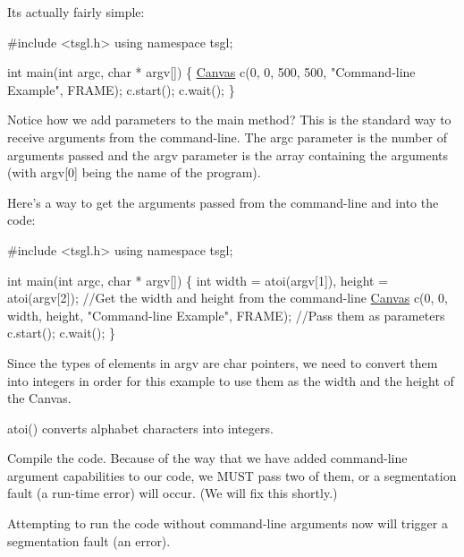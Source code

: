 Its actually fairly simple\-:


\begin{DoxyCode}
\textcolor{preprocessor}{#include <tsgl.h>}
\textcolor{keyword}{using namespace }tsgl;

\textcolor{keywordtype}{int} main(\textcolor{keywordtype}{int} argc, \textcolor{keywordtype}{char} * argv[]) \{
  \hyperlink{classtsgl_1_1_canvas}{Canvas} c(0, 0, 500, 500, \textcolor{stringliteral}{"Command-line Example"}, FRAME);
  c.start();
  c.wait();
\}
\end{DoxyCode}


Notice how we add parameters to the main method? This is the standard way to receive arguments from the command-\/line. The {\ttfamily argc} parameter is the number of arguments passed and the {\ttfamily argv} parameter is the array containing the arguments (with {\ttfamily argv\mbox{[}0\mbox{]}} being the name of the program).

Here's a way to get the arguments passed from the command-\/line and into the code\-:


\begin{DoxyCode}
\textcolor{preprocessor}{#include <tsgl.h>}
\textcolor{keyword}{using namespace }tsgl;

\textcolor{keywordtype}{int} main(\textcolor{keywordtype}{int} argc, \textcolor{keywordtype}{char} * argv[]) \{
  \textcolor{keywordtype}{int} width = atoi(argv[1]), height = atoi(argv[2]);  \textcolor{comment}{//Get the width and height from the command-line}
  \hyperlink{classtsgl_1_1_canvas}{Canvas} c(0, 0, width, height, \textcolor{stringliteral}{"Command-line Example"}, FRAME);  \textcolor{comment}{//Pass them as parameters}
  c.start();
  c.wait();
\}
\end{DoxyCode}


Since the types of elements in {\ttfamily argv} are char pointers, we need to convert them into integers in order for this example to use them as the width and the height of the Canvas.

{\ttfamily atoi()} converts alphabet characters into integers.

Compile the code. Because of the way that we have added command-\/line argument capabilities to our code, we M\-U\-S\-T pass two of them, or a segmentation fault (a run-\/time error) will occur. (We will fix this shortly.)

Attempting to run the code without command-\/line arguments now will trigger a segmentation fault (an error).


